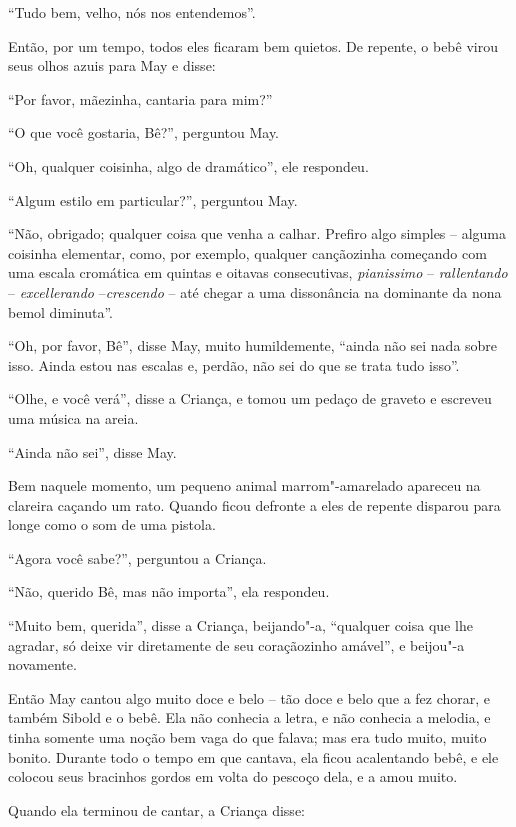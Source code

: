 ``Tudo bem, velho, nós nos entendemos''.

Então, por um tempo, todos eles ficaram bem quietos. De repente, o bebê
virou seus olhos azuis para May e disse:

``Por favor, mãezinha, cantaria para mim?''

``O que você gostaria, Bê?'', perguntou May.

``Oh, qualquer coisinha, algo de dramático'', ele respondeu.

``Algum estilo em particular?'', perguntou May.

``Não, obrigado; qualquer coisa que venha a calhar. Prefiro algo simples
-- alguma coisinha elementar, como, por exemplo, qualquer cançãozinha
começando com uma escala cromática em quintas e oitavas consecutivas,
\emph{pianissimo} -- \emph{rallentando} -- \emph{excellerando}
--\emph{crescendo} -- até chegar a uma dissonância na dominante da nona
bemol diminuta''.

``Oh, por favor, Bê'', disse May, muito humildemente, ``ainda não sei
nada sobre isso. Ainda estou nas escalas e, perdão, não sei do que se
trata tudo isso''.

``Olhe, e você verá'', disse a Criança, e tomou um pedaço de graveto e
escreveu uma música na areia.


``Ainda não sei'', disse May.

Bem naquele momento, um pequeno animal marrom"-amarelado apareceu na
clareira caçando um rato. Quando ficou defronte a eles de repente
disparou para longe como o som de uma pistola.

``Agora você sabe?'', perguntou a Criança.

``Não, querido Bê, mas não importa'', ela respondeu.

``Muito bem, querida'', disse a Criança, beijando"-a, ``qualquer coisa
que lhe agradar, só deixe vir diretamente de seu coraçãozinho amável'',
e beijou"-a novamente.

Então May cantou algo muito doce e belo -- tão doce e belo que a fez
chorar, e também Sibold e o bebê. Ela não conhecia a letra, e não
conhecia a melodia, e tinha somente uma noção bem vaga do que falava;
mas era tudo muito, muito bonito. Durante todo o tempo em que cantava,
ela ficou acalentando bebê, e ele colocou seus bracinhos gordos em volta
do pescoço dela, e a amou muito.

Quando ela terminou de cantar, a Criança disse:

